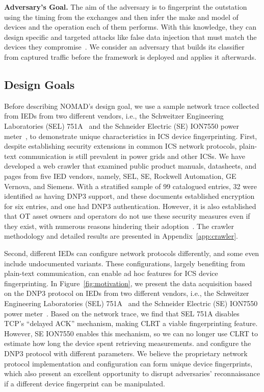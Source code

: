 \documentclass[conference]{IEEEtran}
\begin{document}
\textbf{Adversary's Goal.} The aim of the adversary is to fingerprint the outstation using the timing from the exchanges and then infer the make and model of devices and the operation each of them performs. With this knowledge, they can design specific and targeted attacks like false data injection that must match the devices they compromise~\cite{liufdia2009}.
We consider an  adversary that builds its classifier from captured traffic before the framework is deployed and applies it afterwards.

\subsection{Design Goals}

Before describing NOMAD's design goal, we use a sample network trace collected from IEDs from two different vendors, i.e., the Schweitzer Engineering Laboratories (SEL) 751A~\cite{sel751a} and the Schneider Electric (SE) ION7550 power meter~\cite{seion7550}, to demonstrate unique characteristics in ICS device fingerprinting. First, despite establishing security extensions in common ICS network protocols, plain-text communication is still prevalent in power grids and other ICSs. We have developed a web crawler that examined public product manuals, datasheets, and pages from five IED vendors, namely, SEL, SE, Rockwell Automation, GE Vernova, and Siemens. With a stratified sample of 99 catalogued entries, 32 were identified as having DNP3 support, and these documents established encryption for six entries, and one had DNP3 authentication. However, it is also established that OT asset owners and operators do not use these security measures even if they exist, with numerous reasons hindering their adoption~\cite{CISA2026SecureOT}. The crawler methodology and detailed results are presented in Appendix~\ref{app:crawler}.


Second, different IEDs can configure network protocols differently, and some even include undocumented variants. These configurations, largely benefiting from plain-text communication, can enable ad hoc features for ICS device fingerprinting. In Figure~\ref{fig:motivation}, we present the data acquisition based on the DNP3 protocol on IEDs from two different vendors, i.e., the Schweitzer Engineering Laboratories (SEL) 751A~\cite{sel751a} and the Schneider Electric (SE) ION7550 power meter~\cite{seion7550}. Based on the network trace, we find that SEL 751A disables TCP's ``delayed ACK'' mechanism, making CLRT a viable fingerprinting feature. However, SE ION7550 enables this mechanism, so we can no longer use CLRT to estimate how long the device spent retrieving measurements.  and configure the DNP3 protocol with different parameters. We believe the proprietary network protocol implementation and configuration can form unique device fingerprints, which also present an excellent opportunity to disrupt adversaries' reconnaissance if a different device fingerprint can be manipulated.
\end{document}
